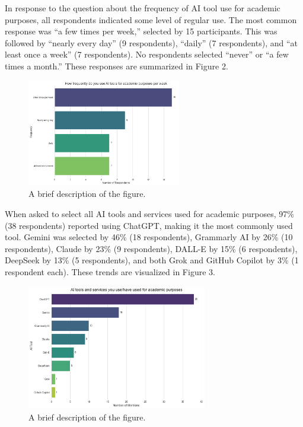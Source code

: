 \documentclass[12pt]{article}
\begin{document}
In response to the question about the frequency of AI tool use for academic purposes, all respondents indicated some level of regular use. The most common response was “a few times per week,” selected by 15 participants. This was followed by “nearly every day” (9 respondents), “daily” (7 respondents), and “at least once a week” (7 respondents). No respondents selected “never” or “a few times a month.” These responses are summarized in Figure 2. 

\begin{figure}[htbp]
  \centering
  \includegraphics[width=0.6\textwidth]{fig2.png} %
  \caption{A brief description of the figure.}
  \label{fig:example1}
\end{figure}

When asked to select all AI tools and services used for academic purposes, 97\% (38 respondents) reported using ChatGPT, making it the most commonly used tool. Gemini was selected by 46\% (18 respondents), Grammarly AI by 26\% (10 respondents), Claude by 23\% (9 respondents), DALL-E by 15\% (6 respondents), DeepSeek by 13\% (5 respondents), and both Grok and GitHub Copilot by 3\% (1 respondent each). These trends are visualized in Figure 3. 

\begin{figure}[htbp]
  \centering
  \includegraphics[width=0.7\textwidth]{fig3.png} %
  \caption{A brief description of the figure.}
  \label{fig:example1}
\end{figure}
\end{document}
